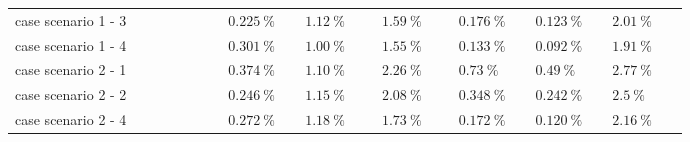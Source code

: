 \documentclass[12pt,a4paper]{scrartcl}
\begin{document}
\begin{onehalfspace}
\begin{center}
\begin{longtable}{p{0.25\linewidth}|p{0.09\linewidth}|p{0.09\linewidth}|p{0.09\linewidth}|p{0.09\linewidth}|p{0.09\linewidth}|p{0.09\linewidth}}
		case scenario 1 - 3 & \hspace*{\fill} $\SI{0.225}{\percent}$ & \hspace*{\fill} $\SI{1.12}{\percent}$ & \hspace*{\fill} $\SI{1.59}{\percent}$ & \hspace*{\fill} $\SI{0.176}{\percent}$ & \hspace*{\fill} $\SI{0.123}{\percent}$ & \hspace*{\fill} $\SI{2.01}{\percent}$\\		
		case scenario 1 - 4 & \hspace*{\fill} $\SI{0.301}{\percent}$ & \hspace*{\fill} $\SI{1.00}{\percent}$ & \hspace*{\fill} $\SI{1.55}{\percent}$ & \hspace*{\fill} $\SI{0.133}{\percent}$ & \hspace*{\fill} $\SI{0.092}{\percent}$ & \hspace*{\fill} $\SI{1.91}{\percent}$\\	
		\hline
		case scenario 2 - 1 & \hspace*{\fill} $\SI{0.374}{\percent}$ & \hspace*{\fill} $\SI{1.10}{\percent}$ & \hspace*{\fill} $\SI{2.26}{\percent}$ & \hspace*{\fill} $\SI{0.73}{\percent}$ & \hspace*{\fill} $\SI{0.49}{\percent}$ & \hspace*{\fill} $\SI{2.77}{\percent}$\\		
		case scenario 2 - 2 & \hspace*{\fill} $\SI{0.246}{\percent}$ & \hspace*{\fill} $\SI{1.15}{\percent}$ & \hspace*{\fill} $\SI{2.08}{\percent}$ & \hspace*{\fill} $\SI{0.348}{\percent}$ & \hspace*{\fill} $\SI{0.242}{\percent}$ & \hspace*{\fill} $\SI{2.5}{\percent}$\\	
		case scenario 2 - 4 & \hspace*{\fill} $\SI{0.272}{\percent}$ & \hspace*{\fill} $\SI{1.18}{\percent}$ & \hspace*{\fill} $\SI{1.73}{\percent}$ & \hspace*{\fill} $\SI{0.172}{\percent}$ & \hspace*{\fill} $\SI{0.120}{\percent}$ & \hspace*{\fill} $\SI{2.16}{\percent}$\\		

\end{longtable}
\end{center}
\end{onehalfspace}
\end{document}
